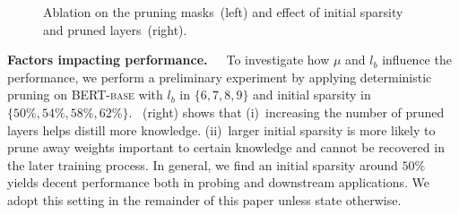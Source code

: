 \begin{figure}[t!]
	\centering
	\caption{Ablation on the pruning masks~(left) and effect of initial sparsity and pruned layers~(right).} \label{fig:both}
\end{figure}
\noindent
\textbf{Factors impacting performance.}~~~To investigate how $\mu$ and $l_b$ influence the  performance, we perform a preliminary experiment by applying deterministic pruning on \textsc{BERT-base} with $l_b$ in $\{6,7,8,9\}$ and initial sparsity in $\{50\%,54\%,58\%,62\%\}$.  ~(right) shows that (i)~increasing the number of pruned layers helps distill more knowledge. (ii)~larger initial sparsity is more likely to prune away weights important to certain knowledge and cannot be recovered in the later training process. In general, we find an initial sparsity around $50\%$ yields decent performance both in probing and downstream applications. We adopt this setting in the remainder of this paper unless state otherwise.
